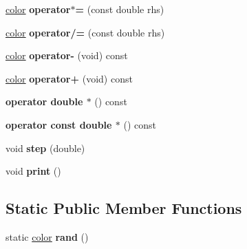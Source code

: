 \begin{DoxyCompactItemize}
\item 
\hypertarget{classmath_1_1color_a254edfc35f21e9dba76329f7305dea8d}{
\hyperlink{classmath_1_1color}{color} {\bfseries operator$\ast$=} (const double rhs)}
\label{classmath_1_1color_a254edfc35f21e9dba76329f7305dea8d}

\item 
\hypertarget{classmath_1_1color_a4a5ee319cd6a2cf197e9041dfeb38b2c}{
\hyperlink{classmath_1_1color}{color} {\bfseries operator/=} (const double rhs)}
\label{classmath_1_1color_a4a5ee319cd6a2cf197e9041dfeb38b2c}

\item 
\hypertarget{classmath_1_1color_a783e826590c6dcb4f3d716df2e9b6280}{
\hyperlink{classmath_1_1color}{color} {\bfseries operator-\/} (void) const }
\label{classmath_1_1color_a783e826590c6dcb4f3d716df2e9b6280}

\item 
\hypertarget{classmath_1_1color_ad774fe2e52d3e486f33d1220db7c3817}{
\hyperlink{classmath_1_1color}{color} {\bfseries operator+} (void) const }
\label{classmath_1_1color_ad774fe2e52d3e486f33d1220db7c3817}

\item 
\hypertarget{classmath_1_1color_a510d0999c7cfa43c544221a547cd71a3}{
{\bfseries operator double $\ast$} () const }
\label{classmath_1_1color_a510d0999c7cfa43c544221a547cd71a3}

\item 
\hypertarget{classmath_1_1color_ad4f9bbb421973871a0a49aa227f302f1}{
{\bfseries operator const double $\ast$} () const }
\label{classmath_1_1color_ad4f9bbb421973871a0a49aa227f302f1}

\item 
\hypertarget{classmath_1_1color_a968829aab17bdacca4371a0aff8d2fb6}{
void {\bfseries step} (double)}
\label{classmath_1_1color_a968829aab17bdacca4371a0aff8d2fb6}

\item 
\hypertarget{classmath_1_1color_abe03c9f06859f670f46f4ce091e48ff7}{
void {\bfseries print} ()}
\label{classmath_1_1color_abe03c9f06859f670f46f4ce091e48ff7}

\end{DoxyCompactItemize}
\subsection*{Static Public Member Functions}
\begin{DoxyCompactItemize}
\item 
\hypertarget{classmath_1_1color_acc4e38ad40c8338a497e254ec9984ac2}{
static \hyperlink{classmath_1_1color}{color} {\bfseries rand} ()}
\label{classmath_1_1color_acc4e38ad40c8338a497e254ec9984ac2}

\end{DoxyCompactItemize}
